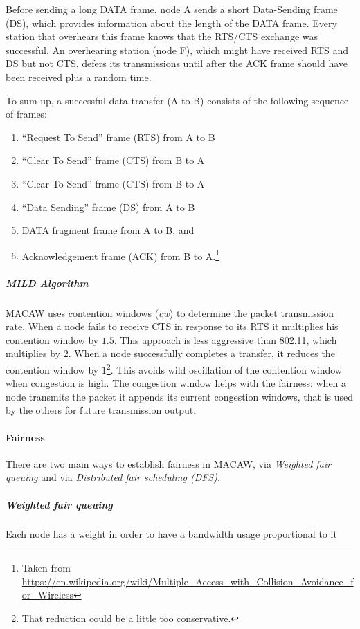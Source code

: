Before sending a long DATA frame, node A sends a short Data-Sending frame (DS),
which provides information about the length of the DATA frame. Every station
that overhears this frame knows that the RTS/CTS exchange was successful. An
overhearing station (node F), which might have received RTS and DS but not CTS,
defers its transmissions until after the ACK frame should have been received
plus a random time.

To sum up, a successful data transfer (A to B) consists of the following
sequence of frames:
\begin{enumerate}
\item ``Request To Send'' frame (RTS) from A to B
\item ``Clear To Send'' frame (CTS) from B to A
\item ``Clear To Send'' frame (CTS) from B to A
\item ``Data Sending'' frame (DS) from A to B
\item DATA fragment frame from A to B, and
\item Acknowledgement frame (ACK) from B to A.\footnote{
Taken from
\url{https://en.wikipedia.org/wiki/Multiple_Access_with_Collision_Avoidance_for_Wireless}
}
\end{enumerate}

\subparagraph*{MILD Algorithm} MACAW uses contention windows (\textit{cw}) to
determine the packet transmission rate. When a node fails to receive CTS in
response to its RTS it multiplies his contention window by $1.5$. This approach
is less aggressive than 802.11, which multiplies by $2$. When a node
successfully completes a transfer, it reduces the contention window by
$1$\footnote{That reduction could be a little too conservative.}. This avoids
wild oscillation of the contention window when congestion is high.
The congestion window helps with the fairness: when a node transmits the
packet it appends its current congestion windows, that is used by the others
for future transmission output.

\paragraph*{Fairness}
There are two main ways to establish fairness in MACAW, via \textit{Weighted
  fair queuing} and via \textit{Distributed fair scheduling (DFS)}.

\subparagraph*{Weighted fair queuing} Each node has a weight in order to have a
bandwidth usage proportional to it

